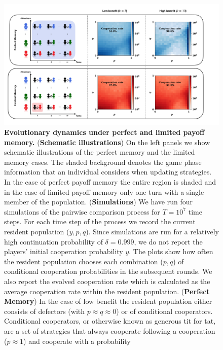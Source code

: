 \documentclass[11pt]{article}
\theoremstyle{plainCl1}
\theoremstyle{plainCl2}
\begin{document}
{
{\setlength{\bibsep}{0\baselineskip}\small


}

\clearpage
\newpage

\begin{figure}[!htbp]
    \centering
    \includegraphics[width=\textwidth]{static/donation_expected_last_round_summary_results.pdf}
    \caption{{\bf Evolutionary dynamics under perfect and limited payoff memory.}
    ({\bf Schematic illustrations}) On the left panels we show schematic
    illustrations of the perfect memory and the limited memory cases. The shaded
    background denotes the game phase information that an individual considers
    when updating strategies. In the case of perfect payoff memory the entire region is
    shaded and in the case of limited payoff memory only one turn with a single member
    of the population. ({\bf Simulations}) We have run four simulations of the
    pairwise comparison process for $T\!=\!10^7$ time steps. For each time step
    of the process
    we record the current resident population ($y,p,q$). Since
    simulations are run for a relatively high continuation probability of
    $\delta\!=\!0.999$, we do not report the players' initial cooperation
    probability $y$. The plots show how often the resident population chooses
    each combination ($p,q$) of conditional cooperation probabilities in the
    subsequent rounds. We also report the evolved cooperation rate which is
    calculated as the average cooperation rate within the resident population.
    ({\bf Perfect Memory}) In the case of low benefit the resident population
    either consists of defectors (with $p\!\approx\!q\!\approx\!0$) or of
    conditional cooperators. Conditional cooperators, or otherwise known as
    generous tit for tat, are a set of strategies that always cooperate
    following a cooperation ($p\!\approx\!1\!$) and cooperate with a probability
}
\end{figure}}
\end{document}
